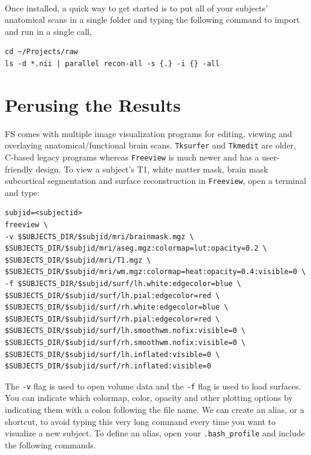\documentclass[paper=a4, fontsize=11pt]{scrartcl} %
\numberwithin{equation}{section} %
\numberwithin{figure}{section} %
\numberwithin{table}{section} %
\begin{document}
~\\Once installed, a quick way to get started is to put all of your subjects' anatomical scans in a single folder and typing the following command to import and run in a single call,
\begin{lstlisting}
cd ~/Projects/raw
ls -d *.nii | parallel recon-all -s {.} -i {} -all
\end{lstlisting}
\section{Perusing the Results}  FS comes with multiple image visualization programs for editing, viewing and overlaying anatomical/functional brain scans.  \texttt{Tksurfer} and \texttt{Tkmedit} are older, C-based legacy programs whereas \texttt{Freeview} is much newer and has a user-friendly design. To view a subject's T1, white matter mask, brain mask subcortical segmentation and surface reconstruction in \texttt{Freeview}, open a terminal and type:
\begin{lstlisting}[frame=single]
subjid=<subjectid>
freeview \
-v $SUBJECTS_DIR/$subjid/mri/brainmask.mgz \                                                                               
$SUBJECTS_DIR/$subjid/mri/aseg.mgz:colormap=lut:opacity=0.2 \                                                                                        
$SUBJECTS_DIR/$subjid/mri/T1.mgz \                                                                                                                  
$SUBJECTS_DIR/$subjid/mri/wm.mgz:colormap=heat:opacity=0.4:visible=0 \                                                                              
-f $SUBJECTS_DIR/$subjid/surf/lh.white:edgecolor=blue \                                                                                             
$SUBJECTS_DIR/$subjid/surf/lh.pial:edgecolor=red \                                                                                                  
$SUBJECTS_DIR/$subjid/surf/rh.white:edgecolor=blue \                                                                                                
$SUBJECTS_DIR/$subjid/surf/rh.pial:edgecolor=red \                                                                                                  
$SUBJECTS_DIR/$subjid/surf/lh.smoothwm.nofix:visible=0 \                                                                                            
$SUBJECTS_DIR/$subjid/surf/rh.smoothwm.nofix:visible=0 \                                                                                            
$SUBJECTS_DIR/$subjid/surf/lh.inflated:visible=0 \                                                                                                  
$SUBJECTS_DIR/$subjid/surf/rh.inflated:visible=0
\end{lstlisting}
The \texttt{-v} flag is used to open volume data and the \texttt{-f} flag is used to load surfaces.  You can indicate which colormap, color, opacity and other plotting options by indicating them with a colon following the file name.  We can create an alias, or a shortcut, to avoid typing this very long command every time you want to visualize a new subject.   To define an alias, open your \texttt{.bash\_profile} and include the following commands.
\end{document}
